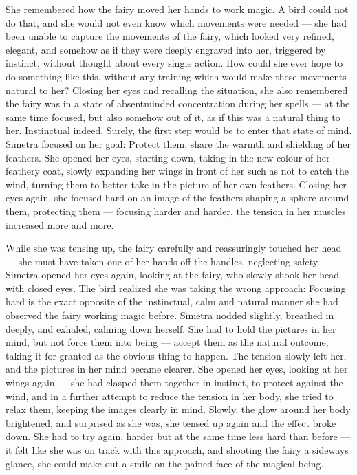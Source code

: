 She remembered how the fairy moved her hands to work magic. A bird could not do that, and she would not even know which movements were needed --- she had been unable to capture the movements of the fairy, which looked very refined, elegant, and somehow as if they were deeply engraved into her, triggered by instinct, without thought about every single action. How could she ever hope to do something like this, without any training which would make these movements natural to her? Closing her eyes and recalling the situation, she also remembered the fairy was in a state of absentminded concentration during her spells --- at the same time focused, but also somehow out of it, as if this was a natural thing to her. Instinctual indeed. Surely, the first step would be to enter that state of mind. Simetra focused on her goal: Protect them, share the warmth and shielding of her feathers. She opened her eyes, starting down, taking in the new colour of her feathery coat, slowly expanding her wings in front of her such as not to catch the wind, turning them to better take in the picture of her own feathers. Closing her eyes again, she focused hard on an image of the feathers shaping a sphere around them, protecting them --- focusing harder and harder, the tension in her muscles increased more and more.

While she was tensing up, the fairy carefully and reassuringly touched her head --- she must have taken one of her hands off the handles, neglecting safety. Simetra opened her eyes again, looking at the fairy, who slowly shook her head with closed eyes. The bird realized she was taking the wrong approach: Focusing hard is the exact opposite of the instinctual, calm and natural manner she had observed the fairy working magic before. Simetra nodded slightly, breathed in deeply, and exhaled, calming down herself. She had to hold the pictures in her mind, but not force them into being --- accept them as the natural outcome, taking it for granted as the obvious thing to happen. The tension slowly left her, and the pictures in her mind became clearer. She opened her eyes, looking at her wings again --- she had clasped them together in instinct, to protect against the wind, and in a further attempt to reduce the tension in her body, she tried to relax them, keeping the images clearly in mind. Slowly, the glow around her body brightened, and surprised as she was, she tensed up again and the effect broke down. She had to try again, harder but at the same time less hard than before --- it felt like she was on track with this approach, and shooting the fairy a sideways glance, she could make out a smile on the pained face of the magical being.

